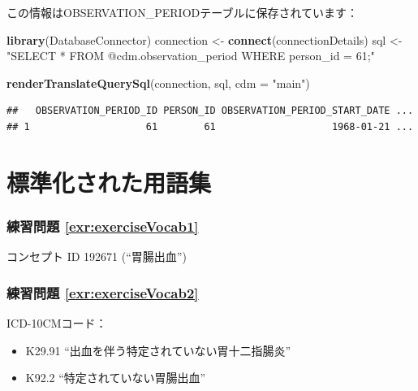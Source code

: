 \documentclass[
  11pt]{book}
\newenvironment{Shaded}{\begin{snugshade}}{\end{snugshade}}
\newcommand{\AttributeTok}[1]{\textcolor[rgb]{0.13,0.29,0.53}{#1}}
\newcommand{\FunctionTok}[1]{\textcolor[rgb]{0.13,0.29,0.53}{\textbf{#1}}}
\newcommand{\NormalTok}[1]{#1}
\newcommand{\OtherTok}[1]{\textcolor[rgb]{0.56,0.35,0.01}{#1}}
\newcommand{\StringTok}[1]{\textcolor[rgb]{0.31,0.60,0.02}{#1}}
\providecommand{\tightlist}{%
  \setlength{\itemsep}{0pt}\setlength{\parskip}{0pt}}
\theoremstyle{definition}
\theoremstyle{definition}
\theoremstyle{definition}
\theoremstyle{definition}
\theoremstyle{remark}
\begin{document}
この情報はOBSERVATION\_PERIODテーブルに保存されています：

\begin{Shaded}
\begin{Highlighting}[]
\FunctionTok{library}\NormalTok{(DatabaseConnector)}
\NormalTok{connection }\OtherTok{\textless{}{-}} \FunctionTok{connect}\NormalTok{(connectionDetails)}
\NormalTok{sql }\OtherTok{\textless{}{-}} \StringTok{"SELECT *}
\StringTok{FROM @cdm.observation\_period}
\StringTok{WHERE person\_id = 61;"}

\FunctionTok{renderTranslateQuerySql}\NormalTok{(connection, sql, }\AttributeTok{cdm =} \StringTok{"main"}\NormalTok{)}
\end{Highlighting}
\end{Shaded}

\begin{verbatim}
##   OBSERVATION_PERIOD_ID PERSON_ID OBSERVATION_PERIOD_START_DATE ...
## 1                    61        61                    1968-01-21 ...
\end{verbatim}

\section{標準化された用語集}\label{Vocabanswers}

\subsubsection*{練習問題 \ref{exr:exerciseVocab1}}\label{ux7df4ux7fd2ux554fux984c-refexrexercisevocab1}

コンセプト ID 192671 (``胃腸出血'')

\subsubsection*{練習問題 \ref{exr:exerciseVocab2}}\label{ux7df4ux7fd2ux554fux984c-refexrexercisevocab2}

ICD-10CMコード：

\begin{itemize}
\tightlist
\item
  K29.91 ``出血を伴う特定されていない胃十二指腸炎''
\item
  K92.2 ``特定されていない胃腸出血''
\end{itemize}
\end{document}
